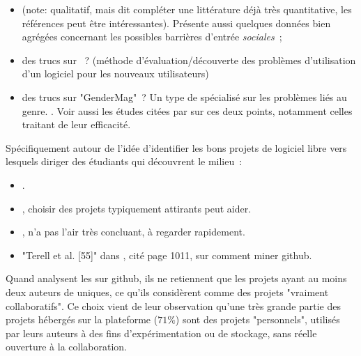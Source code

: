 
\begin{itemize}
    \item {} (note: qualitatif, mais dit compléter une littérature déjà très
        quantitative, les références peut être intéressantes). Présente aussi quelques données bien agrégées
        concernant les possibles barrières d'entrée \emph{sociales} ;
    \item des trucs sur  ? (méthode  d'évaluation/découverte des
        problèmes d'utilisation d'un logiciel pour les nouveaux utilisateurs)
    \item des trucs sur "GenderMag" ? Un type de  spécialisé sur les problèmes liés
        au genre. . Voir aussi les études citées par
        \textcite[p.~1005-1006]{barriers-2018} sur ces deux points, notamment celles traitant de leur
        efficacité.
\end{itemize}

Spécifiquement autour de l'idée d'identifier les bons projets de logiciel libre vers lesquels diriger des
étudiants qui découvrent le milieu :

\begin{itemize}
    \item {}.
    \item {}, choisir des projets typiquement attirants peut aider.
    \item {}, n'a pas l'air très concluant, à regarder rapidement.
    \item "Terell et al. [55]" dans \textcite{barriers-2018}, cité page 1011, sur comment miner \gls{github}.
\end{itemize}

Quand  analysent les  sur \gls{github}, ils ne
retiennent que les projets ayant au moins deux auteurs de  uniques, ce qu'ils considèrent comme
des projets "vraiment collaboratifs". Ce choix vient de leur observation qu'une très grande partie des projets
hébergés sur la plateforme ($71\%$) sont des projets "personnels", utilisés par leurs auteurs à des fins
d'expérimentation ou de stockage, sans réelle ouverture à la collaboration.
